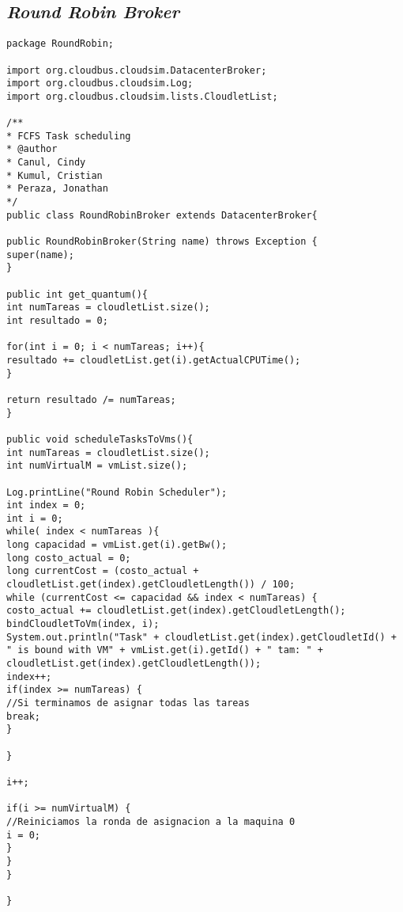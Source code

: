 \subsection*{\textit{Round Robin Broker}}
\begin{lstlisting}
package RoundRobin;

import org.cloudbus.cloudsim.DatacenterBroker;
import org.cloudbus.cloudsim.Log;
import org.cloudbus.cloudsim.lists.CloudletList;

/**
* FCFS Task scheduling
* @author
* Canul, Cindy
* Kumul, Cristian
* Peraza, Jonathan
*/
public class RoundRobinBroker extends DatacenterBroker{

public RoundRobinBroker(String name) throws Exception {
super(name);
}

public int get_quantum(){
int numTareas = cloudletList.size();
int resultado = 0;

for(int i = 0; i < numTareas; i++){
resultado += cloudletList.get(i).getActualCPUTime();
}

return resultado /= numTareas;
}

public void scheduleTasksToVms(){
int numTareas = cloudletList.size();
int numVirtualM = vmList.size();

Log.printLine("Round Robin Scheduler");
int index = 0;
int i = 0;
while( index < numTareas ){
long capacidad = vmList.get(i).getBw();
long costo_actual = 0;
long currentCost = (costo_actual + cloudletList.get(index).getCloudletLength()) / 100;
while (currentCost <= capacidad && index < numTareas) {
costo_actual += cloudletList.get(index).getCloudletLength();
bindCloudletToVm(index, i);
System.out.println("Task" + cloudletList.get(index).getCloudletId() + " is bound with VM" + vmList.get(i).getId() + " tam: " + cloudletList.get(index).getCloudletLength());
index++;
if(index >= numTareas) {
//Si terminamos de asignar todas las tareas
break;
}

}

i++;

if(i >= numVirtualM) {
//Reiniciamos la ronda de asignacion a la maquina 0
i = 0;
}
}
}

}

\end{lstlisting}


